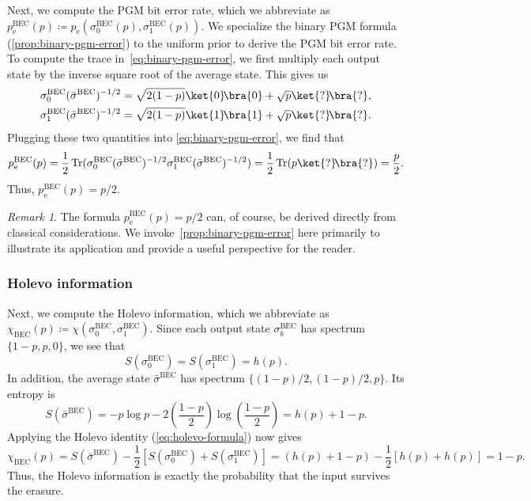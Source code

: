 \documentclass[11pt]{article}
\theoremstyle{remark}
\newtheorem{remark}{Remark}[section]
\newcommand{\ketbra}[2]{\ket{#1}\!\bra{#2}}
\newcommand{\Tr}{\operatorname{Tr}}
\newcommand{\BEC}{\mathrm{BEC}}
\begin{document}
Next, we compute the PGM bit error rate, which we abbreviate as $p_{\mathrm{e}}^{\BEC}(p) \coloneqq p_{\mathrm{e}}(\sigma_0^{\BEC}(p),\sigma_1^{\BEC}(p))$. We specialize the binary PGM formula (\cref{prop:binary-pgm-error}) to the uniform prior to derive the PGM bit error rate. To compute the trace in~\cref{eq:binary-pgm-error}, we first multiply each output state by the inverse square root of the average state. This gives us
\begin{align*}
\sigma_0^{\BEC}(\bar{\sigma}^{\BEC})^{-1/2} &= \sqrt{2(1-p)}\ketbra{0}{0} + \sqrt{p}\ketbra{?}{?}, \\
\sigma_1^{\BEC}(\bar{\sigma}^{\BEC})^{-1/2} &= \sqrt{2(1-p)}\ketbra{1}{1} + \sqrt{p}\ketbra{?}{?}.
\end{align*}
Plugging these two quantities into \eqref{eq:binary-pgm-error}, we find that
\begin{equation*}
p_{\mathrm{e}}^{\BEC}(p) = \frac{1}{2}\Tr(\sigma_0^{\BEC}(\bar{\sigma}^{\BEC})^{-1/2}\sigma_1^{\BEC}(\bar{\sigma}^{\BEC})^{-1/2}) = \frac{1}{2}\Tr(p\ketbra{?}{?}) = \frac{p}{2}.
\end{equation*}
Thus, $p_{\mathrm{e}}^{\BEC}(p) = p/2$.

\begin{remark}
The formula $p_{\mathrm{e}}^{\BEC}(p) = p/2$ can, of course, be derived directly from classical considerations. We invoke~\cref{prop:binary-pgm-error} here primarily to illustrate its application and provide a useful perspective for the reader.
\end{remark}

\subsubsection{Holevo information}
\label{subsubsec:bec-holevo}

Next, we compute the Holevo information, which we abbreviate as $\chi_\BEC(p) \coloneqq \chi(\sigma_0^{\BEC},\sigma_1^{\BEC})$. Since each output state $\sigma_b^{\BEC}$ has spectrum $\{1-p,p,0\}$, we see that
\begin{equation*}
S(\sigma_0^{\BEC}) = S(\sigma_1^{\BEC}) = h(p).
\end{equation*}
In addition, the average state $\bar{\sigma}^{\BEC}$ has spectrum $\{(1-p)/2,(1-p)/2,p\}$. Its entropy is
\begin{equation*}
S(\bar{\sigma}^{\BEC}) = -p\log{p}-2\left(\frac{1-p}{2}\right)\log{\left(\frac{1-p}{2}\right)} = h(p)+1-p.
\end{equation*}
Applying the Holevo identity (\cref{eq:holevo-formula}) now gives
\begin{equation*}
\chi_{\BEC}(p) = S(\bar{\sigma}^{\BEC}) - \frac{1}{2}\left[S(\sigma_0^{\BEC})+S(\sigma_1^{\BEC})\right] = (h(p)+1-p) -\frac{1}{2}\left[h(p)+h(p)\right] = 1-p.
\end{equation*}
Thus, the Holevo information is exactly the probability that the input survives the erasure.
\end{document}
